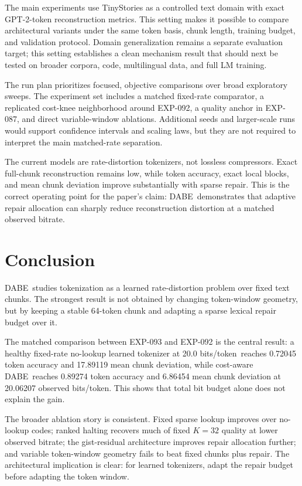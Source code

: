 \documentclass[11pt]{article}
\newcommand{\dabe}{\textsc{DABE}}
\newcommand{\Exp}[1]{\textsc{EXP-#1}}
\newcommand{\bitsper}{bits/token}
\begin{document}
The main experiments use TinyStories as a controlled text domain with exact GPT-2-token reconstruction metrics. This setting makes it possible to compare architectural variants under the same token basis, chunk length, training budget, and validation protocol. Domain generalization remains a separate evaluation target; this setting establishes a clean mechanism result that should next be tested on broader corpora, code, multilingual data, and full LM training.

The run plan prioritizes focused, objective comparisons over broad exploratory sweeps. The experiment set includes a matched fixed-rate comparator, a replicated cost-knee neighborhood around \Exp{092}, a quality anchor in \Exp{087}, and direct variable-window ablations. Additional seeds and larger-scale runs would support confidence intervals and scaling laws, but they are not required to interpret the main matched-rate separation.

The current models are rate-distortion tokenizers, not lossless compressors. Exact full-chunk reconstruction remains low, while token accuracy, exact local blocks, and mean chunk deviation improve substantially with sparse repair. This is the correct operating point for the paper's claim: \dabe\ demonstrates that adaptive repair allocation can sharply reduce reconstruction distortion at a matched observed bitrate.

\section{Conclusion}
\dabe\ studies tokenization as a learned rate-distortion problem over fixed text chunks. The strongest result is not obtained by changing token-window geometry, but by keeping a stable 64-token chunk and adapting a sparse lexical repair budget over it.

The matched comparison between \Exp{093} and \Exp{092} is the central result: a healthy fixed-rate no-lookup learned tokenizer at 20.0 \bitsper\ reaches 0.72045 token accuracy and 17.89119 mean chunk deviation, while cost-aware \dabe\ reaches 0.89274 token accuracy and 6.86454 mean chunk deviation at 20.06207 observed \bitsper. This shows that total bit budget alone does not explain the gain.

The broader ablation story is consistent. Fixed sparse lookup improves over no-lookup codes; ranked halting recovers much of fixed $K=32$ quality at lower observed bitrate; the gist-residual architecture improves repair allocation further; and variable token-window geometry fails to beat fixed chunks plus repair. The architectural implication is clear: for learned tokenizers, adapt the repair budget before adapting the token window.



\end{document}
